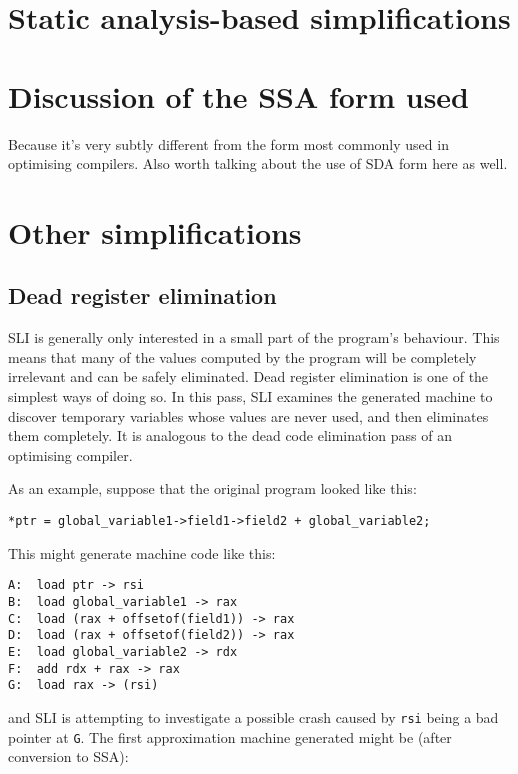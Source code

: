 \documentclass[12pt,a4paper]{book}
\begin{document}
\section{Static analysis-based simplifications}
\section{Discussion of the SSA form used}
Because it's very subtly different from the form most commonly used in optimising compilers.
Also worth talking about the use of SDA form here as well.

\section{Other simplifications}
\subsection{Dead register elimination}

SLI is generally only interested in a small part of the program's behaviour.
This means that many of the values computed by the program will be completely irrelevant and can be safely eliminated.
Dead register elimination is one of the simplest ways of doing so.
In this pass, SLI examines the generated machine to discover temporary variables whose values are never used, and then eliminates them completely.
It is analogous to the dead code elimination pass of an optimising compiler.

As an example, suppose that the original program looked like this:

\begin{verbatim}
*ptr = global_variable1->field1->field2 + global_variable2;
\end{verbatim}

This might generate machine code like this:

\begin{verbatim}
A:  load ptr -> rsi
B:  load global_variable1 -> rax
C:  load (rax + offsetof(field1)) -> rax
D:  load (rax + offsetof(field2)) -> rax
E:  load global_variable2 -> rdx
F:  add rdx + rax -> rax
G:  load rax -> (rsi)
\end{verbatim}

and SLI is attempting to investigate a possible crash caused by \verb|rsi| being a bad pointer at \verb|G|.
The first approximation machine generated might be (after conversion to SSA):
\end{document}
